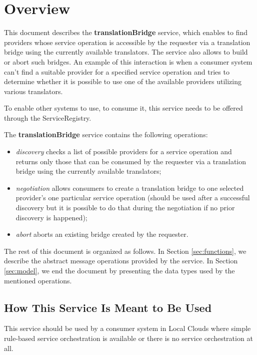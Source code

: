\documentclass[a4paper]{arrowhead}
\begin{document}
\section{Overview}
\label{sec:overview}
This document describes the \textbf{translationBridge} service, which enables to find providers whose service operation is accessible by the requester via a translation bridge using the currently available translators. The service also allows to build or abort such bridges. An example of this interaction is when a consumer system can't find a suitable provider for a specified service operation and tries to determine whether it is possible to use one of the available providers utilizing various translators.

To enable other systems to use, to consume it, this service needs to be offered through the ServiceRegistry.

The \textbf{translationBridge} service contains the following operations:

\begin{itemize}
    \item \textit{discovery} checks a list of possible providers for a service operation and returns only those that can be consumed by the requester via a translation bridge using the currently available translators;
    \item \textit{negotiation} allows consumers to create a translation bridge to one selected provider's one particular service operation (should be used after a successful discovery but it is possible to do that during the negotiation if no prior discovery is happened);
    \item \textit{abort} aborts an existing bridge created by the requester.
\end{itemize}

The rest of this document is organized as follows.
In Section \ref{sec:functions}, we describe the abstract message operations provided by the service.
In Section \ref{sec:model}, we end the document by presenting the data types used by the mentioned operations.

\subsection{How This Service Is Meant to Be Used}

This service should be used by a consumer system in Local Clouds where simple rule-based service orchestration is available or there is no service orchestration at all.
\end{document}
